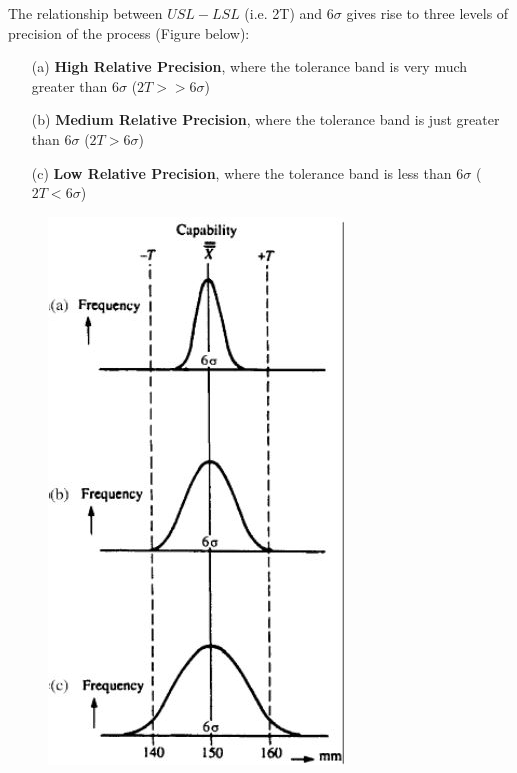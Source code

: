 \documentclass[11pt]{article} %
\begin{document}
\noindent	The relationship between $USL-LSL$ (i.e. 2T) and $6\sigma$ gives rise
	to three levels of precision of the process (Figure below):
	
	\begin{itemize}
		
		\item[(a)] \textbf{High Relative Precision}, where the tolerance band is very much greater
		than $6\sigma$ ($2T > > 6\sigma$) 
		
		\item[(b)] \textbf{Medium Relative Precision}, where the tolerance band is just greater than
		$6\sigma$ ($2T > 6\sigma$) 
		
		\item[(c)]\textbf{Low Relative Precision}, where the tolerance band is less than
		$6\sigma$ ($2T < 6\sigma$)
	\end{itemize}
\newpage
	\begin{figure}[h!]
		\centering
		\includegraphics[width=0.60\linewidth]{proccapindices/image1b}
	\end{figure}
	
	\newpage
\end{document}

